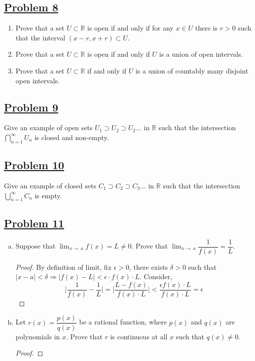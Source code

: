 \documentclass[10pt,letterpaper]{article}
\begin{document}
	\subsection*{{\color{purple}\underline{Problem 8}}}
	\begin{enumerate}
		\item Prove that a set $U \subset \mathbb{R}$ is open if and only if for any $x \in U$
		there is $r > 0$ such that the interval $(x - r, x + r) \subset U$.
		\item Prove that a set $U \subset \mathbb{R}$ is open if and only if $U$ is a union of open intervals.
		\item Prove that a set $U \subset \mathbb{R}$ if and only if $U$ is a union of countably many disjoint open
		intervals.
	\end{enumerate}
	
	
	\subsection*{{\color{purple}\underline{Problem 9}}}
	Give an example of open sets $U_1 \supset U_2 \supset U_2 \ldots$ in $\mathbb{R}$ such that the intersection
	$\displaystyle\bigcap_{n=1}^{\infty} U_n$ is closed and non-empty.
	
	\subsection*{{\color{purple}\underline{Problem 10}}}
	Give an example of closed sets $C_1 \supset C_2 \supset C_3 \ldots$ in $\mathbb{R}$ such that the intersection
	$\displaystyle\bigcup_{n=1}^{\infty} C_n$ is empty.
	
	\subsection*{{\color{purple}\underline{Problem 11}}}
	\begin{enumerate}[(a)]
		\item Suppose that $\displaystyle\lim_{x\to\ a}f(x) = L \neq 0$. Prove that 
		$\displaystyle\lim_{x\to\ a}\dfrac{1}{f(x)} = \dfrac{1}{L}$.
	\begin{proof}
		By definition of limit, fix $\epsilon > 0$, there exists $\delta > 0$ such that
		$|x - a| < \delta \Rightarrow |f(x) - L| < \epsilon \cdot f(x) \cdot L$. Consider,
		$$\bigg|\dfrac{1}{f(x)} - \dfrac{1}{L}\bigg|
		= \bigg|\dfrac{L - f(x)}{f(x) \cdot L}\bigg| < \dfrac{\epsilon f(x) \cdot L}{f(x) \cdot L} = \epsilon$$
	\end{proof}
		\item Let $r(x) = \dfrac{p(x)}{q(x)}$ be a rational function, where $p(x)$ and $q(x)$ are
		polynomials in $x$. Prove that $r$ is continuous at all $x$ such that $q(x) \neq 0$.
	\begin{proof}
	
	\end{proof}
	\end{enumerate}
	
\end{document}
